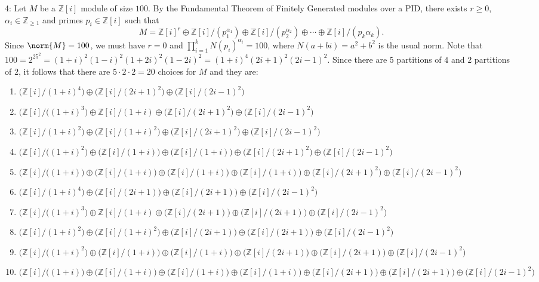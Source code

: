 \documentclass[12pt]{article}
\newcommand{\Z}{\mathbb{Z}}
\begin{document}
{4: Let $M$ be a $\Z[i]$ module of size $100$. By the Fundamental Theorem of Finitely Generated modules over a PID, there exists $r\ge 0$, $\alpha_i\in\Z_{\ge 1}$ and primes $p_i\in\Z[i]$ such that
\[M=\Z[i]^r\oplus\Z[i]/(p_1^{\alpha_1})\oplus\Z[i]/(p_2^{\alpha_2})\oplus\dotsb\oplus\Z[i]/(p_k{\alpha_k}).\]
Since $\norm{M}=100$, we must have $r=0$ and $\prod_{i=1}^kN(p_i)^{\alpha_i}=100$, where $N(a+bi)=a^2+b^2$ is the usual norm. Note that $100=2^25^2=(1+i)^2(1-i)^2(1+2i)^2(1-2i)^2=(1+i)^4(2i+1)^2(2i-1)^2$. Since there are $5$ partitions of $4$ and $2$ partitions of $2$, it follows that there are $5\cdot2\cdot2=20$ choices for $M$ and they are:
{\fontsize{9}{7}\selectfont
\begin{enumerate}
\item$\bigl(\Z[i]/(1+i)^4\bigr)\oplus\bigl(\Z[i]/(2i+1)^2\bigr)\oplus\bigl(\Z[i]/(2i-1)^2\bigr)$
\item$\bigl(\Z[i]/((1+i)^3\bigr)\oplus\Z[i]/(1+i)\oplus\bigl(\Z[i]/(2i+1)^2\bigr)\oplus\bigl(\Z[i]/(2i-1)^2\bigr)$
\item$\bigl(\Z[i]/(1+i)^2\bigr)\oplus\bigl(\Z[i]/(1+i)^2\bigr)\oplus\bigl(\Z[i]/(2i+1)^2\bigr)\oplus\bigl(\Z[i]/(2i-1)^2\bigr)$
\item$\bigl(\Z[i]/((1+i)^2\bigr)\oplus\bigl(\Z[i]/(1+i)\bigr)\oplus\bigl(\Z[i]/(1+i)\bigr)\oplus\bigl(\Z[i]/(2i+1)^2\bigr)\oplus\bigl(\Z[i]/(2i-1)^2\bigr)$
\item$\bigl(\Z[i]/((1+i)\bigr)\oplus\bigl(\Z[i]/(1+i)\bigr)\oplus\bigl(\Z[i]/(1+i)\bigr)\oplus\bigl(\Z[i]/(1+i)\bigr)\oplus\bigl(\Z[i]/(2i+1)^2\bigr)\oplus\bigl(\Z[i]/(2i-1)^2\bigr)$
\item$\bigl(\Z[i]/(1+i)^4\bigr)\oplus\bigl(\Z[i]/(2i+1)\bigr)\oplus\bigl(\Z[i]/(2i+1)\bigr)\oplus\bigl(\Z[i]/(2i-1)^2\bigr)$
\item$\bigl(\Z[i]/((1+i)^3\bigr)\oplus\Z[i]/(1+i)\oplus\bigl(\Z[i]/(2i+1)\bigr)\oplus\bigl(\Z[i]/(2i+1)\bigr)\oplus\bigl(\Z[i]/(2i-1)^2\bigr)$
\item$\bigl(\Z[i]/(1+i)^2\bigr)\oplus\bigl(\Z[i]/(1+i)^2\bigr)\oplus\bigl(\Z[i]/(2i+1)\bigr)\oplus\bigl(\Z[i]/(2i+1)\bigr)\oplus\bigl(\Z[i]/(2i-1)^2\bigr)$
\item$\bigl(\Z[i]/((1+i)^2\bigr)\oplus\bigl(\Z[i]/(1+i)\bigr)\oplus\bigl(\Z[i]/(1+i)\bigr)\oplus\bigl(\Z[i]/(2i+1)\bigr)\oplus\bigl(\Z[i]/(2i+1)\bigr)\oplus\bigl(\Z[i]/(2i-1)^2\bigr)$
\item$\bigl(\Z[i]/((1+i)\bigr)\oplus\bigl(\Z[i]/(1+i)\bigr)\oplus\bigl(\Z[i]/(1+i)\bigr)\oplus\bigl(\Z[i]/(1+i)\bigr)\oplus\bigl(\Z[i]/(2i+1)\bigr)\oplus\bigl(\Z[i]/(2i+1)\bigr)\oplus\bigl(\Z[i]/(2i-1)^2\bigr)$

\end{enumerate}}}
\end{document}
